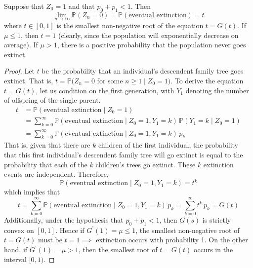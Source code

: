 \documentclass{article}
\begin{document}
      \begin{theorem}
        Suppose that $Z_0 = 1$ and that $p_0 + p_1 < 1$. Then
        \begin{equation}
          \lim_{n \rightarrow \infty} \mathbb{P}(Z_n = 0) = \mathbb{P}(\text{eventual extinction}) = t
        \end{equation}
        where $t \in [0, 1]$ is the smallest non-negative root of the equation $t = G(t)$. If $\mu \leq 1$, then $t = 1$ (clearly, since the population will exponentially decrease on average). If $\mu > 1$, there is a positive probability that the population never goes extinct. 
      \end{theorem}
      \begin{proof}
        Let $t$ be the probability that an individual's descendent family tree goes extinct. That is, $t = \mathbb{P}(Z_n = 0$ for some $n \geq 1 \; | \; Z_0 = 1)$. To derive the equation $t = G(t)$, let us condition on the first generation, with $Y_1$ denoting the number of offspring of the single parent. 
        \begin{align*}
          t & = \mathbb{P}(\text{eventual extinction} \; | \; Z_0 = 1) \\
          & = \sum_{k=0}^\infty \mathbb{P}(\text{eventual extinction} \; | \; Z_0 = 1, Y_1 = k) \, \mathbb{P}(Y_1 = k \; | \; Z_0 = 1) \\
          & = \sum_{k=0}^\infty \mathbb{P}(\text{eventual extinction} \; | \;Z_0 =1, Y_1 = k) \, p_k
        \end{align*}
        That is, given that there are $k$ children of the first individual, the probability that this first individual's descendent family tree will go extinct is equal to the probability that each of the $k$ children's trees go extinct. These $k$ extinction events are independent. Therefore, 
        \begin{equation}
          \mathbb{P}(\text{eventual extinction} \; | \;Z_0 = 1, Y_1 = k) = t^k
        \end{equation}
        which implies that 
        \begin{equation}
          t = \sum_{k=0}^\infty \mathbb{P}(\text{eventual extinction} \; | \; Z_0 = 1, Y_1 = k) \, p_k = \sum_{k=0}^\infty t^k \, p_k = G(t)
        \end{equation}
        Additionally, under the hypothesis that $p_0 + p_1 < 1$, then $G(s)$ is strictly convex on $[0,1]$. Hence if $G^\prime (1) = \mu \leq 1$, the smallest non-negative root of $t = G(t)$ must be $t=1 \implies$ extinction occurs with probability 1. On the other hand, if $G^\prime (1) = \mu > 1$, then the smallest root of $t = G(t)$ occurs in the interval $[0,1)$. 
      \end{proof}
\end{document}
